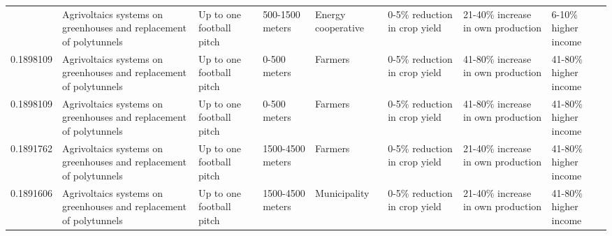 \begin{table}
\begin{tabular}[t]{rlllllll}
\addlinespace
0.1899714 & Agrivoltaics systems on greenhouses
and replacement of polytunnels & Up to one football pitch & 500-1500 meters & Energy cooperative & 0-5\% reduction in crop yield & 21-40\% increase in own production & 6-10\% higher income\\
0.1898109 & Agrivoltaics systems on greenhouses
and replacement of polytunnels & Up to one football pitch & 0-500 meters & Farmers & 0-5\% reduction in crop yield & 41-80\% increase in own production & 41-80\% higher income\\
0.1898109 & Agrivoltaics systems on greenhouses
and replacement of polytunnels & Up to one football pitch & 0-500 meters & Farmers & 0-5\% reduction in crop yield & 41-80\% increase in own production & 41-80\% higher income\\
0.1891762 & Agrivoltaics systems on greenhouses
and replacement of polytunnels & Up to one football pitch & 1500-4500 meters & Farmers & 0-5\% reduction in crop yield & 21-40\% increase in own production & 41-80\% higher income\\
0.1891606 & Agrivoltaics systems on greenhouses
and replacement of polytunnels & Up to one football pitch & 1500-4500 meters & Municipality & 0-5\% reduction in crop yield & 21-40\% increase in own production & 41-80\% higher income\\
\bottomrule
\end{tabular}
\end{table}

